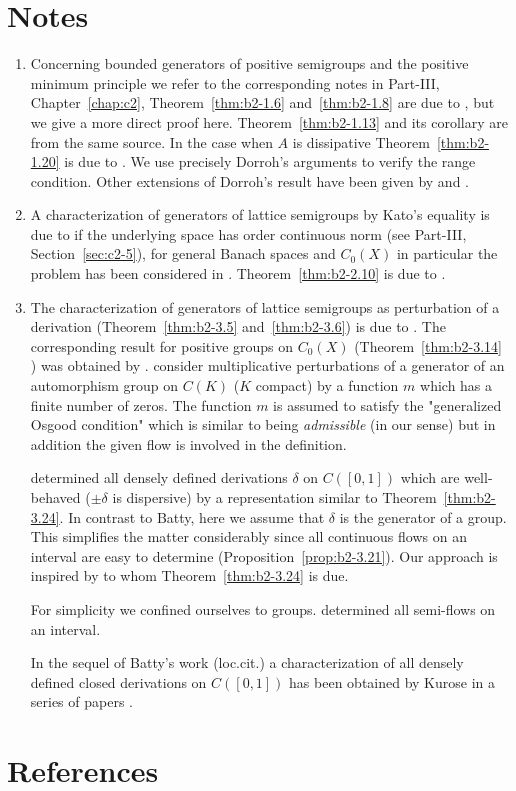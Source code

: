\section*{Notes}
\label{notes:b2}
\begin{enumerate}[label=\emph{Section \arabic*:}, wide]

\item
Concerning bounded generators of positive semigroups and the positive minimum principle we refer to the corresponding notes in Part-III, Chapter~\ref{chap:c2},  Theorem~\ref{thm:b2-1.6} and~\ref{thm:b2-1.8} are due to \textcite{arendtchernoffkato:1982}, but we give a more direct proof here.
Theorem~\ref{thm:b2-1.13} and its corollary are from the same source.
In the case when $A$ is dissipative Theorem~\ref{thm:b2-1.20} is due to \textcite{dorroh:1966}.
We use precisely Dorroh's arguments to verify the range condition.
Other extensions of Dorroh's result have been given by \textcite{lumer:1974} and \textcite{lumer:1975}.

\item 
A characterization of generators of lattice semigroups by Kato's equality is due to  \textcite{nageluhlig:1981} if the underlying space has order continuous norm (see Part-III, Section~\ref{sec:c2-5}), for general Banach spaces and $C_{0}(X)$ in particular the problem has been considered in \textcite{arendt:1982}.
Theorem~\ref{thm:b2-2.10} is due to \textcite{uhlig:1979}.

\item
The characterization of generators of lattice semigroups as perturbation of a derivation (Theorem~\ref{thm:b2-3.5} and~\ref{thm:b2-3.6}) is due to \textcite{derndingernagel:1979}.
The corresponding result for positive groups on $C_{0}(X)$ (Theorem~\ref{thm:b2-3.14} ) was obtained by \textcite{arendtgreiner:1984}.
\textcite{linetal:1977} consider multiplicative perturbations of a generator of an automorphism group on $C(K)$ ($K$ compact) by a function $m$ which has a finite number of zeros.
The function $m$ is assumed to satisfy the "generalized Osgood condition" which is similar to being \emph{admissible} (in our sense) but in addition the given flow is involved in the definition.

\textcite{batty:1981} determined all densely defined derivations $\delta$ on $C([0,1])$ which are well-behaved (\ie  $\pm\delta$ is dispersive) by a representation similar to Theorem~\ref{thm:b2-3.24}.
In contrast to Batty, here we assume that $\delta$ is the generator of a group.
This simplifies the matter considerably since all continuous flows on an interval are easy to determine (Proposition~\ref{prop:b2-3.21}).
Our approach is inspired by \textcite{delaubenfels:1984} to whom Theorem~\ref{thm:b2-3.24} is due.

For simplicity we confined ourselves to groups.
\textcite{uhlig:1979} determined all semi-flows on an interval.

In the sequel of Batty's work (loc.cit.) a characterization of all densely defined closed derivations on $C([0,1])$ has been obtained by Kurose in a series of papers 
\textcite{kurose:1981, kurose:1982, kurose:1983}.
\end{enumerate}
\section*{References}
{\RaggedRight
  \printbibliography[heading=none]
 }

